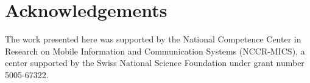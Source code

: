 \documentclass[10pt]{sensys-abstract}
\begin{document}
\section{Acknowledgements}
\label{sec:acknowledgements}
The work presented here was supported by the National Competence Center in Research on Mobile Information and Communication Systems (NCCR-MICS), a center supported by the Swiss National Science Foundation under grant number 5005-67322.


{\small

}

\balancecolumns
\end{document}
